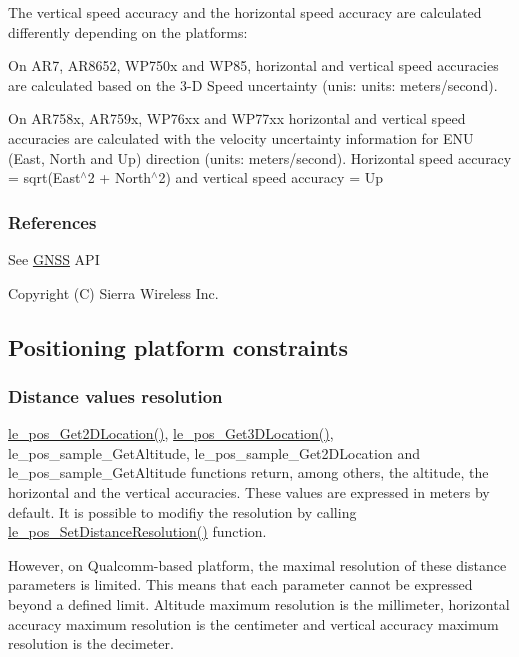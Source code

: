 The vertical speed accuracy and the horizontal speed accuracy are calculated differently depending on the platforms\+:

On A\+R7, A\+R8652, W\+P750x and W\+P85, horizontal and vertical speed accuracies are calculated based on the 3-\/D Speed uncertainty (unis\+: units\+: meters/second).

On A\+R758x, A\+R759x, W\+P76xx and W\+P77xx horizontal and vertical speed accuracies are calculated with the velocity uncertainty information for E\+NU (East, North and Up) direction (units\+: meters/second). Horizontal speed accuracy = sqrt(East$^\wedge$2 + North$^\wedge$2) and vertical speed accuracy = Up\hypertarget{platformConstraintsGnss_platformConstraintsGnss_References}{}\subsubsection{References}\label{platformConstraintsGnss_platformConstraintsGnss_References}
See \hyperlink{c_gnss}{G\+N\+SS} A\+PI

Copyright (C) Sierra Wireless Inc. \hypertarget{platformConstraintsPositioning}{}\subsection{Positioning platform constraints}\label{platformConstraintsPositioning}
\hypertarget{platformConstraintsPositioning_platformConstraintsPositioning_SettingResolution}{}\subsubsection{Distance values resolution}\label{platformConstraintsPositioning_platformConstraintsPositioning_SettingResolution}
{\ttfamily \hyperlink{le__pos__interface_8h_a0aefc90df207f2e20286ea1be88e70d4}{le\+\_\+pos\+\_\+\+Get2\+D\+Location()}}, {\ttfamily \hyperlink{le__pos__interface_8h_ad2e96a853c9e3d4daa351494ff2070ba}{le\+\_\+pos\+\_\+\+Get3\+D\+Location()}}, {\ttfamily le\+\_\+pos\+\_\+sample\+\_\+\+Get\+Altitude}, {\ttfamily le\+\_\+pos\+\_\+sample\+\_\+\+Get2\+D\+Location} and {\ttfamily le\+\_\+pos\+\_\+sample\+\_\+\+Get\+Altitude} functions return, among others, the altitude, the horizontal and the vertical accuracies. These values are expressed in meters by default. It is possible to modifiy the resolution by calling {\ttfamily \hyperlink{le__pos__interface_8h_a3e013d5f757ac82bfde049848418bfb7}{le\+\_\+pos\+\_\+\+Set\+Distance\+Resolution()}} function.

However, on Qualcomm-\/based platform, the maximal resolution of these distance parameters is limited. This means that each parameter cannot be expressed beyond a defined limit. Altitude maximum resolution is the millimeter, horizontal accuracy maximum resolution is the centimeter and vertical accuracy maximum resolution is the decimeter.


